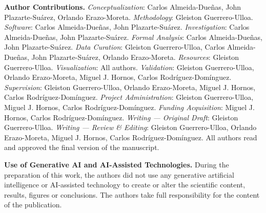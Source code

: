 \documentclass[pdflatex,sn-apa]{sn-jnl}%
\begin{document}
    \textbf{Author Contributions.}
        \emph{Conceptualization}: Carlos Almeida-Due\~nas, John Plazarte-Su\'arez, Orlando Erazo-Moreta.
        \emph{Methodology}: Gleiston Guerrero-Ulloa.
        \emph{Software}: Carlos Almeida-Due\~nas, John Plazarte-Su\'arez.
        \emph{Investigation}: Carlos Almeida-Due\~nas, John Plazarte-Su\'arez.
        \emph{Formal Analysis}: Carlos Almeida-Due\~nas, John Plazarte-Su\'arez.
        \emph{Data Curation}: Gleiston Guerrero-Ulloa, Carlos Almeida-Due\~nas, John Plazarte-Su\'arez, Orlando Erazo-Moreta.
        \emph{Resources}: Gleiston Guerrero-Ulloa.
        \emph{Visualization}: All authors.
        \emph{Validation}: Gleiston Guerrero-Ulloa, Orlando Erazo-Moreta, Miguel J. Hornos, Carlos Rodr\'iguez-Dom\'inguez.
        \emph{Supervision}: Gleiston Guerrero-Ulloa, Orlando Erazo-Moreta, Miguel J. Hornos, Carlos Rodr\'iguez-Dom\'inguez.
        \emph{Project Administration}: Gleiston Guerrero-Ulloa, Miguel J. Hornos, Carlos Rodr\'iguez-Dom\'inguez.
        \emph{Funding Acquisition}: Miguel J. Hornos, Carlos Rodr\'iguez-Dom\'inguez.
        \emph{Writing --- Original Draft}: Gleiston Guerrero-Ulloa.
        \emph{Writing --- Review \& Editing}: Gleiston Guerrero-Ulloa, Orlando Erazo-Moreta, Miguel J. Hornos, Carlos Rodr\'iguez-Dom\'inguez.
        All authors read and approved the final version of the manuscript.

    \textbf{Use of Generative AI and AI-Assisted Technologies.}
        During the preparation of this work, the authors did not use any generative artificial intelligence or AI-assisted technology to create or alter the scientific content, results, figures or conclusions. The authors take full responsibility for the content of the publication.


\begin{appendices}
    
\end{appendices}



\end{document}
